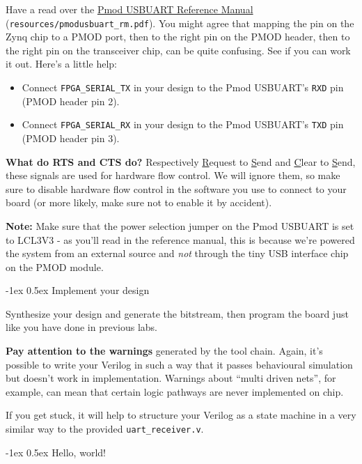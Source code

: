 \documentclass[11pt]{article}
\makeatletter
\renewcommand{\subsection}
{\@startsection {subsection}{1}{0pt}
 {-1ex}
 {0.5ex}
 {\bfseries\normalsize}}
\makeatother
\begin{document}
Have a read over the \href{https://reference.digilentinc.com/reference/pmod/pmodusbuart/reference-manual}{Pmod USBUART Reference Manual} (\verb|resources/pmodusbuart_rm.pdf|). You might agree that mapping the pin on the Zynq chip to a PMOD port, then to the right pin on the PMOD header, then to the right pin on the transceiver chip, can be quite confusing. See if you can work it out. Here's a little help:

\begin{itemize}
  \item Connect \verb|FPGA_SERIAL_TX| in your design to the Pmod USBUART's \verb|RXD| pin (PMOD header pin 2).
  \item Connect \verb|FPGA_SERIAL_RX| in your design to the Pmod USBUART's \verb|TXD| pin (PMOD header pin 3).
\end{itemize}

\textbf{What do RTS and CTS do?} Respectively \underline{R}equest to \underline{S}end and \underline{C}lear to \underline{S}end, these signals are used for hardware flow control. We will ignore them, so make sure to disable hardware flow control in the software you use to connect to your board (or more likely, make sure not to enable it by accident).

\textbf{Note:} Make sure that the power selection jumper on the Pmod USBUART is set to LCL3V3 - as you'll read in the reference manual, this is because we're powered the system from an external source and \emph{not} through the tiny USB interface chip on the PMOD module.

\subsection{Implement your design}

Synthesize your design and generate the bitstream, then program the board just like you have done in previous labs.

\textbf{Pay attention to the warnings} generated by the tool chain. Again, it's possible to write your Verilog in such a way that it passes behavioural simulation but doesn't work in implementation. Warnings about ``multi driven nets'', for example, can mean that certain logic pathways are never implemented on chip.

If you get stuck, it will help to structure your Verilog as a state machine in a very similar way to the provided \verb|uart_receiver.v|.

\subsection{Hello, world!}
\end{document}
